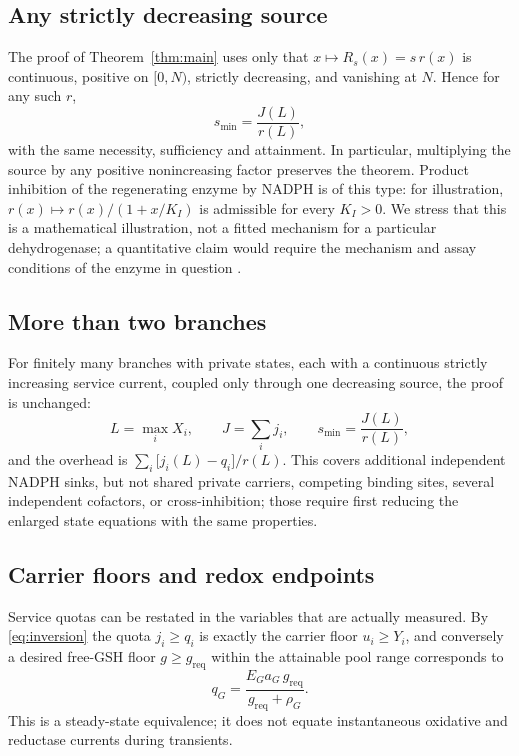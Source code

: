 \documentclass[11pt,a4paper]{article}
\theoremstyle{plain}
\theoremstyle{definition}
\theoremstyle{remark}
\begin{document}
\subsection{Any strictly decreasing source}\label{sec:general}

The proof of Theorem~\ref{thm:main} uses only that $x\mapsto R_s(x)=s\,r(x)$ is
continuous, positive on $[0,N)$, strictly decreasing, and vanishing at $N$. Hence
for any such $r$,
\begin{equation}\label{eq:general}
  s_{\min}=\frac{J(L)}{r(L)} ,
\end{equation}
with the same necessity, sufficiency and attainment. In particular, multiplying
the source by any positive nonincreasing factor preserves the theorem. Product
inhibition of the regenerating enzyme by NADPH is of this type: for illustration,
$r(x)\mapsto r(x)/(1+x/K_I)$ is admissible for every $K_I>0$. We stress that this
is a mathematical illustration, not a fitted mechanism for a particular
dehydrogenase; a quantitative claim would require the mechanism and assay
conditions of the enzyme in question \citep{adediran1991,stanton2012}.

\subsection{More than two branches}

For finitely many branches with private states, each with a continuous strictly
increasing service current, coupled only through one decreasing source, the proof
is unchanged:
\[
  L=\max_iX_i,\qquad J=\sum_ij_i,\qquad s_{\min}=\frac{J(L)}{r(L)},
\]
and the overhead is $\sum_i\bigl[j_i(L)-q_i\bigr]/r(L)$. This covers additional
independent NADPH sinks, but not shared private carriers, competing binding sites,
several independent cofactors, or cross-inhibition; those require first reducing
the enlarged state equations with the same properties.

\subsection{Carrier floors and redox endpoints}\label{sec:floors}

Service quotas can be restated in the variables that are actually measured. By
\eqref{eq:inversion} the quota $j_i\ge q_i$ is exactly the carrier floor
$u_i\ge Y_i$, and conversely a desired free-GSH floor $g\ge g_{\mathrm{req}}$ within
the attainable pool range corresponds to
\[
  q_G=\frac{E_Ga_G\,g_{\mathrm{req}}}{g_{\mathrm{req}}+\rho_G} .
\]
This is a steady-state equivalence; it does not equate instantaneous oxidative and
reductase currents during transients.
\end{document}
